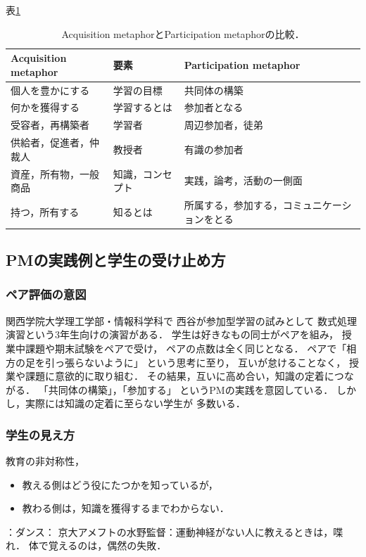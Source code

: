 \documentclass{jsarticle}
\begin{document}
表\ref{tab:orgdde65b1}

\begin{table}[bt]
\caption{\label{tab:orgdde65b1}
Acquisition metaphorとParticipation metaphorの比較．}
\centering
\begin{tabular}{lll}
\hline
Acquisition metaphor & 要素 & Participation metaphor\\
\hline
個人を豊かにする & 学習の目標 & 共同体の構築\\
何かを獲得する & 学習するとは & 参加者となる\\
受容者，再構築者 & 学習者 & 周辺参加者，徒弟\\
供給者，促進者，仲裁人 & 教授者 & 有識の参加者\\
資産，所有物，一般商品 & 知識，コンセプト & 実践，論考，活動の一側面\\
持つ，所有する & 知るとは & 所属する，参加する，コミュニケーションをとる\\
\hline
\end{tabular}
\end{table}

\subsection{PMの実践例と学生の受け止め方}
\label{sec:orga4eed65}
\subsubsection{ペア評価の意図}
\label{sec:org1ad99ee}
関西学院大学理工学部・情報科学科で
西谷が参加型学習の試みとして
数式処理演習という3年生向けの演習がある．
学生は好きなもの同士がペアを組み，
授業中課題や期末試験をペアで受け，
ペアの点数は全く同じとなる．
ペアで「相方の足を引っ張らないように」
という思考に至り，
互いが怠けることなく，
授業や課題に意欲的に取り組む．
その結果，互いに高め合い，知識の定着につながる．
「共同体の構築」，「参加する」
というPMの実践を意図している．
しかし，実際には知識の定着に至らない学生が
多数いる．
\subsubsection{学生の見え方}
\label{sec:orgb48ec7c}
教育の非対称性，
\begin{itemize}
\item 教える側はどう役にたつかを知っているが，
\item 教わる側は，知識を獲得するまでわからない．
\end{itemize}
：ダンス：
京大アメフトの水野監督：運動神経がない人に教えるときは，喋れ．
体で覚えるのは，偶然の失敗．
\end{document}
